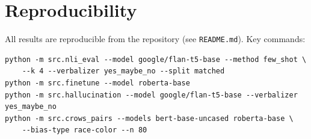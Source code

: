 \documentclass[11pt]{article}
\begin{document}
\section{Reproducibility}
All results are reproducible from the repository (see \texttt{README.md}). Key commands:
\begin{verbatim}
python -m src.nli_eval --model google/flan-t5-base --method few_shot \
    --k 4 --verbalizer yes_maybe_no --split matched
python -m src.finetune --model roberta-base
python -m src.hallucination --model google/flan-t5-base --verbalizer yes_maybe_no
python -m src.crows_pairs --models bert-base-uncased roberta-base \
    --bias-type race-color --n 80
\end{verbatim}
\end{document}
